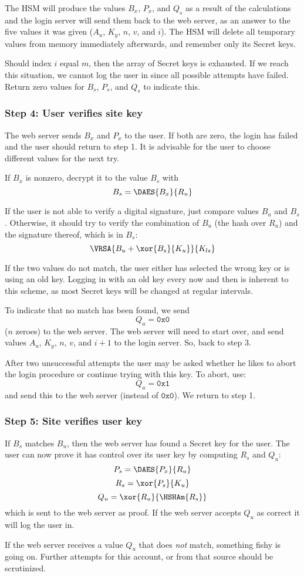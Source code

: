 The HSM will produce the values $B_x$,
$P_x$,
and $Q_s$ as a result of the calculations and the login server will send them back to the web server,
as an answer to the five values it was given ($A_u$, $K_y$, $n$, $v$, and $i$).
The HSM will delete all temporary values from memory immediately afterwards,
and remember only its Secret keys.
\par
Should index $i$ equal $m$, then the array of Secret keys is exhausted.
If we reach this situation, we cannot log the user in since all possible attempts have failed.
Return zero values for $B_s$, $P_s$, and $Q_s$ to indicate this.

\subsubsection{Step 4: User verifies site key}
\label{sec:login_step4}
The web server sends $B_x$ and $P_x$ to the user.
If both are zero, the login has failed and the user should return to step 1.
It is advisable for the user to choose different values for the next try.
\par
If $B_x$ is nonzero,
decrypt it to the value $B_s$ with
\[B_s=\DAES{B_x}{R_u}\]
\par
If the user is not able to verify a digital signature,
just compare values $B_u$ and $B_s$.
Otherwise,
it should try to verify the combination of $B_u$
(the hash over $R_u$)
and the signature thereof,
which is in $B_s$:
\[\VRSA{B_u+\xor{B_s}{K_u}}{K_{ls}}\]
\par
If the two values do not match,
the user either has selected the wrong key or is using an old key.
Logging in with an old key every now and then is inherent to this scheme,
as most Secret keys will be changed at regular intervals.
\par
To indicate that no match has been found, we send
\[Q_u=\mathtt{0x0}\]
($n$ zeroes) to the web server.
The web server will need to start over, and send values $A_u$, $K_y$, $n$, $v$, and $i+1$ to the login server.
So, back to step 3.
\par
After two unsuccessful attempts the user may be asked
whether he likes to abort the login procedure or continue trying with this key.
To abort, use:
\[Q_u=\mathtt{0x1}\]
and send this to the web server
(instead of $\mathtt{0x0}$).
We return to step 1.

\subsubsection{Step 5: Site verifies user key}
\label{sec:login_step5}
If $B_s$ matches $B_u$, then the web server has found a Secret key for the user.
The user can now prove it has control over its user key by computing $R_s$ and $Q_u$:
\[P_s=\DAES{P_x}{R_u}\]
\[R_s=\xor{P_s}{K_u}\]
\[Q_u=\xor{R_u}{\HSHAm{R_s}}\]
which is sent to the web server as proof.
If the web server accepts $Q_u$ as correct it will log the user in.
\par
If the web server receives a value $Q_u$ that does \emph{not} match,
something fishy is going on.
Further attempts for this account, or from that source should be scrutinized.

